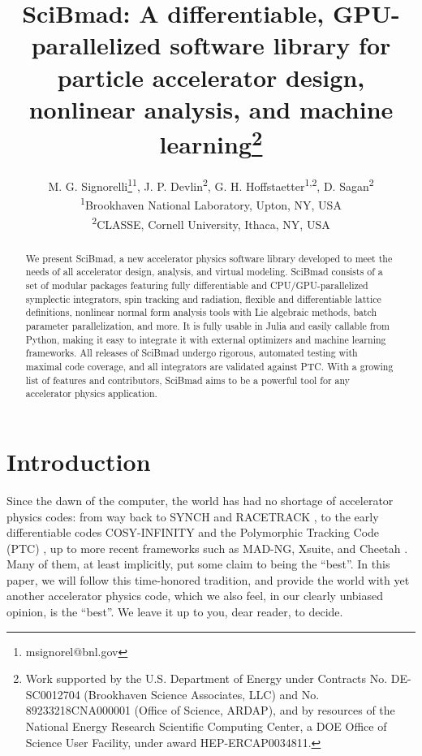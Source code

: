 \documentclass[a4paper,
               biblatex,     %
               ]{jacow}
\begin{document}
\title{
SciBmad: A differentiable, GPU-parallelized software library for particle accelerator design, nonlinear analysis, and machine learning\thanks{Work supported by the U.S. Department of Energy under Contracts No. DE-SC0012704 (Brookhaven Science Associates, LLC) and No. 89233218CNA000001 (Office of Science, ARDAP), and by resources of the National Energy Research Scientific Computing Center, a DOE Office of Science User Facility, under award HEP-ERCAP0034811.}}

\author{M. G. Signorelli\thanks{msignorel@bnl.gov}\textsuperscript{1}, J. P. Devlin\textsuperscript{2}, G. H. Hoffstaetter\textsuperscript{1,2}, D. Sagan\textsuperscript{2}\\
\textsuperscript{1}Brookhaven National Laboratory, Upton, NY, USA\\
\textsuperscript{2}CLASSE, Cornell University, Ithaca, NY, USA\\}
\maketitle

%
\begin{abstract}
We present SciBmad, a new accelerator physics software library developed to meet the needs of all accelerator design, analysis, and virtual modeling. SciBmad consists of a set of modular packages featuring fully differentiable and CPU/GPU-parallelized symplectic integrators, spin tracking and radiation, flexible and differentiable lattice definitions, nonlinear normal form analysis tools with Lie algebraic methods, batch parameter parallelization, and more. It is fully usable in Julia and easily callable from Python, making it easy to integrate it with external optimizers and machine learning frameworks. All releases of SciBmad undergo rigorous, automated testing with maximal code coverage, and all integrators are validated against PTC. With a growing list of features and contributors, SciBmad aims to be a powerful tool for any accelerator physics application.
\end{abstract}

\section{Introduction}
Since the dawn of the computer, the world has had no shortage of accelerator physics codes: from way back to SYNCH and RACETRACK \cite{racetrack}, to the early differentiable codes COSY-INFINITY and the Polymorphic Tracking Code (PTC) \cite{berz1999modern,Forest:573082,Forest_2006}, up to more recent frameworks such as MAD-NG, Xsuite, and Cheetah \cite{deniau2025madngstandalonemultiplatformtool,Iadarola:2023fuk,PhysRevAccelBeams.27.054601}. Many of them, at least implicitly, put some claim to being the ``best''. In this paper, we will follow this time-honored tradition, and provide the world with yet another accelerator physics code, which we also feel, in our clearly unbiased opinion, is the ``best''. We leave it up to you, dear reader, to decide.
\end{document}
